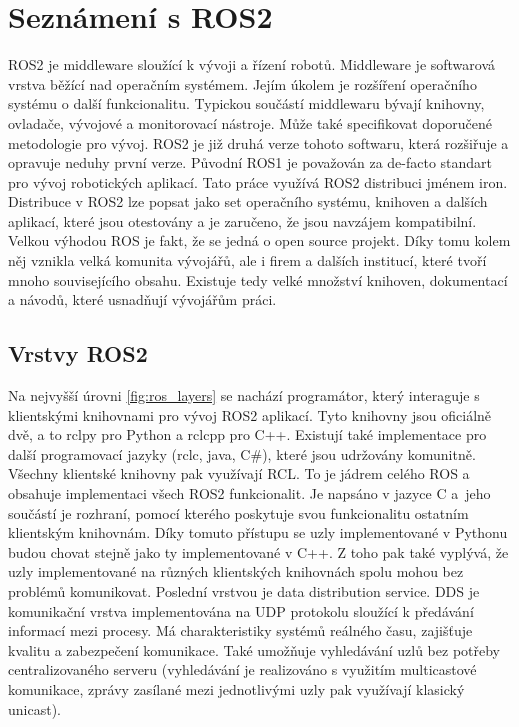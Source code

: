 \section{Seznámení s ROS2}
ROS2 je middleware sloužící k vývoji a řízení robotů. Middleware je softwarová vrstva běžící nad operačním systémem. Jejím úkolem je rozšíření operačního systému o další funkcionalitu. Typickou součástí middlewaru bývají knihovny, ovladače, vývojové a monitorovací nástroje. Může také specifikovat doporučené metodologie pro vývoj. ROS2 je již druhá verze tohoto softwaru, která rozšiřuje a opravuje neduhy první verze. Původní ROS1 je považován za de-facto standart pro vývoj robotických aplikací.
Tato práce využívá ROS2 distribuci jménem iron. Distribuce v ROS2 lze popsat jako set operačního systému, knihoven a dalších aplikací, které jsou otestovány a je zaručeno, že jsou navzájem kompatibilní. Velkou výhodou ROS je fakt, že se jedná o open source projekt. Díky tomu kolem něj vznikla velká komunita vývojářů, ale i firem a dalších institucí, které tvoří mnoho souvisejícího obsahu. Existuje tedy velké množství knihoven, dokumentací a návodů, které usnadňují vývojářům práci. \cite[str:~1-5]{ros2_introduction}

\subsection*{Vrstvy ROS2}
Na nejvyšší úrovni \ref{fig:ros_layers} se nachází programátor, který interaguje s klientskými knihovnami pro vývoj ROS2 aplikací. Tyto knihovny jsou oficiálně dvě, a to rclpy pro Python a rclcpp pro C++. Existují také implementace pro další programovací jazyky (rclc, java, C\#), které jsou udržovány komunitně. Všechny klientské knihovny pak využívají RCL. To je jádrem celého ROS a obsahuje implementaci všech ROS2 funkcionalit. Je napsáno v jazyce C a~jeho součástí je rozhraní, pomocí kterého poskytuje svou funkcionalitu ostatním klientským knihovnám. Díky tomuto přístupu se uzly implementované v Pythonu budou chovat stejně jako ty implementované v C++. Z toho pak také vyplývá, že uzly implementované na různých klientských knihovnách spolu mohou bez problémů komunikovat.
Poslední vrstvou je data distribution service. DDS je komunikační vrstva implementována na UDP protokolu sloužící k předávání informací mezi procesy. Má charakteristiky systémů reálného času, zajišťuje kvalitu a zabezpečení komunikace. Také umožňuje vyhledávání uzlů bez potřeby centralizovaného serveru (vyhledávání je realizováno s využitím multicastové komunikace, zprávy zasílané mezi jednotlivými uzly pak využívají klasický unicast). \cite[str:~13-15]{ros2_introduction}


